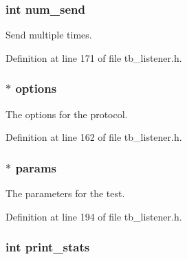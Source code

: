 \hypertarget{structtb__listener__t_a875fd564b2b2de100e6fc2090a06812c}{
\subsubsection[{num\-\_\-send}]{\setlength{\rightskip}{0pt plus 5cm}int num\-\_\-send}}\label{structtb__listener__t_a875fd564b2b2de100e6fc2090a06812c}


Send multiple times. 



Definition at line 171 of file tb\-\_\-listener.\-h.

\hypertarget{structtb__listener__t_abe6a138a14cade5eb871eeb66ee2b638}{
\subsubsection[{options}]{$\ast$ options}}\label{structtb__listener__t_abe6a138a14cade5eb871eeb66ee2b638}


The options for the protocol. 



Definition at line 162 of file tb\-\_\-listener.\-h.

\hypertarget{structtb__listener__t_ada07b15315fdcc71589ed7b50faec50a}{
\subsubsection[{params}]{$\ast$ params}}\label{structtb__listener__t_ada07b15315fdcc71589ed7b50faec50a}


The parameters for the test. 



Definition at line 194 of file tb\-\_\-listener.\-h.

\hypertarget{structtb__listener__t_a21a0be842e8fa2c780fa87f45bd5d17e}{
\subsubsection[{print\-\_\-stats}]{\setlength{\rightskip}{0pt plus 5cm}int print\-\_\-stats}}\label{structtb__listener__t_a21a0be842e8fa2c780fa87f45bd5d17e}


